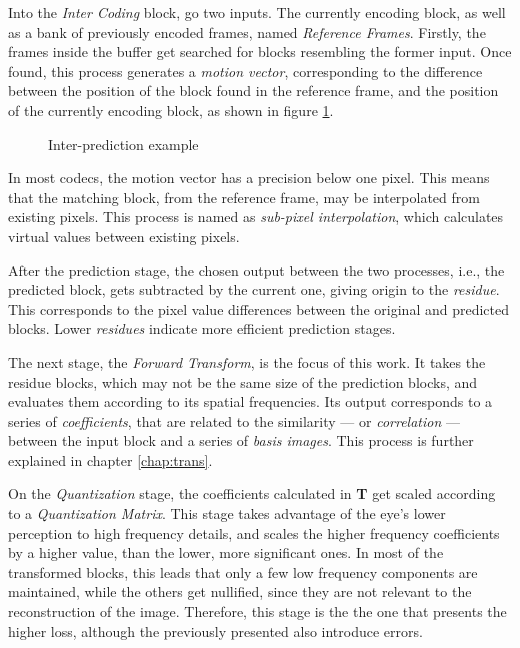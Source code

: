 Into the \emph{Inter Coding} block, go two inputs. The currently encoding block, as well as a bank of previously encoded frames, named \emph{Reference Frames}. Firstly, the frames inside the buffer get searched for blocks resembling the former input. Once found, this process generates a \emph{motion vector}, corresponding to the difference between the position of the block found in the reference frame, and the position of the currently encoding block, as shown in figure \ref{fig:interex}.

\begin{figure}[!htbp]
    \centering
    
    \caption{Inter-prediction example}
    \label{fig:interex}
\end{figure}

In most codecs, the motion vector has a precision below one pixel. This means that the matching block, from the reference frame, may be interpolated from existing pixels. This process is named as \emph{sub-pixel interpolation}, which calculates virtual values between existing pixels. 

After the prediction stage, the chosen output between the two processes, i.e., the predicted block, gets subtracted by the current one, giving origin to the \emph{residue}. This corresponds to the pixel value differences between the original and predicted blocks. Lower \emph{residues} indicate more efficient prediction stages.

The next stage, the \emph{Forward Transform}, is the focus of this work. It takes the residue blocks, which may not be the same size of the prediction blocks, and evaluates them according to its spatial frequencies. Its output corresponds to a series of \emph{coefficients}, that are related to the similarity --- or \emph{correlation} --- between the input block and a series of \emph{basis images}. This process is further explained in chapter \ref{chap:trans}.

On the \emph{Quantization} stage, the coefficients calculated in \textbf{T} get scaled according to a \emph{Quantization Matrix}. This stage takes advantage of the eye's lower perception to high frequency details, and scales the higher frequency coefficients by a higher value, than the lower, more significant ones. In most of the transformed blocks, this leads that only a few low frequency components are maintained, while the others get nullified, since they are not relevant to the reconstruction of the image. Therefore, this stage is the the one that presents the higher loss, although the previously presented also introduce errors.

